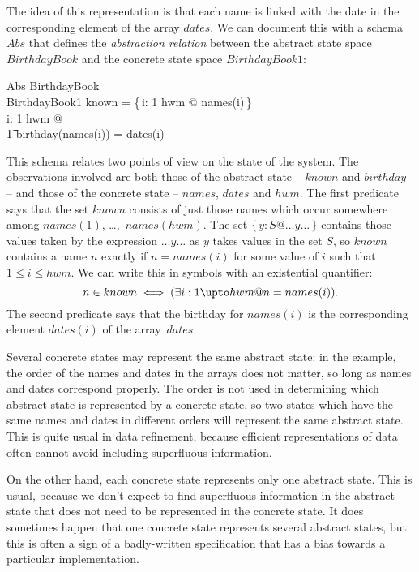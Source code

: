 The idea of this representation is that each name is linked with the
date in the corresponding element of the array $dates$. We can
document this with a schema $Abs$ that defines the {\em
abstraction relation\/} between the abstract state space
$BirthdayBook$ and the concrete state space $BirthdayBook1$:
\begin{schema}{Abs}
	BirthdayBook \\
	BirthdayBook1
\where
	known = \{\,i: 1 \upto hwm @ names(i)\,\} \\
\also
	\forall i: 1 \upto hwm @ \\
\t1		birthday(names(i)) = dates(i)
\end{schema}
This schema relates two points of view on the state of the system.
The observations involved are both those of the abstract state --
$known$ and $birthday$ -- and those of the concrete state -- $names$,
$dates$ and $hwm$.  The first predicate says that the set $known$
consists of just those names which occur somewhere among $names(1)$,
\dots,~$names(hwm)$.
The set $\{\,y: S @ \ldots y \ldots\,\}$ contains those values
taken by the expression $\ldots y \ldots$ as $y$ takes values in the
set $S$, so $known$ contains a name $n$ exactly if $n = names(i)$ for
some value of $i$ such that $1 \leq i \leq hwm$. We can write this in
symbols with an existential quantifier:
\[ n \in known \iff (\exists i: 1 \upto hwm @ n = names(i)). \]
The second predicate says that the birthday for $names(i)$ is the
corresponding element $dates(i)$ of the array~$dates$.

\new Several concrete states may represent the same abstract state:
in the example, the order of the names and dates in the arrays does
not matter, so long as names and dates correspond properly. The
order is not used in determining which abstract state is represented
by a concrete state, so two states which have the same names and
dates in different orders will represent the same abstract state.
This is quite usual in data refinement, because efficient
representations of data often cannot avoid including superfluous
information.
 
\new On the other hand, each concrete state represents only one
abstract state.  This is usual, because we don't expect to find
superfluous information in the abstract state that does not need to
be represented in the concrete state. It does sometimes
happen that one concrete state represents several abstract states,
but this is often a sign of a badly-written
specification that has a bias towards a particular implementation.

